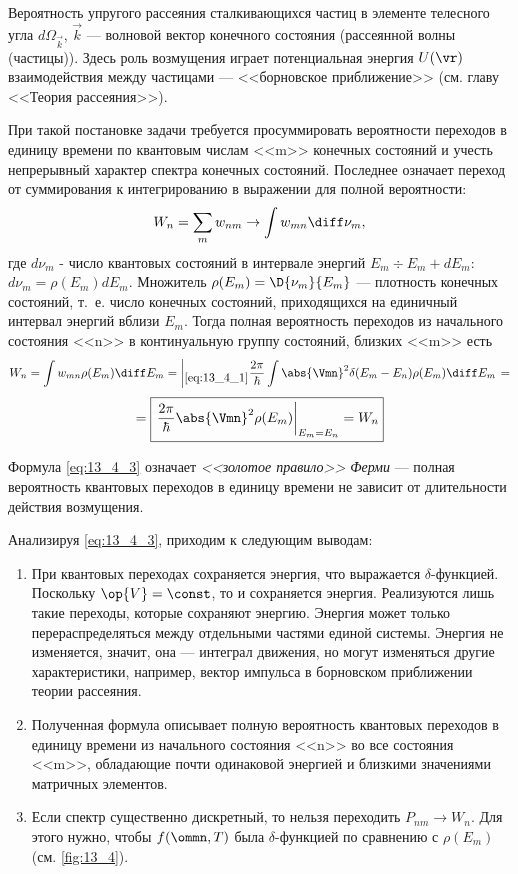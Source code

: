 \begin{exmpl}
Вероятность упругого рассеяния сталкивающихся частиц в элементе телесного угла $d\Omega_{\vec k}$, $\vec k$ --- волновой вектор конечного состояния (рассеянной волны (частицы)). Здесь роль возмущения играет потенциальная энергия $U(\vr)$ взаимодействия между частицами --- <<борновское приближение>> (см. главу  <<Теория рассеяния>>).
\end{exmpl}

При такой постановке задачи требуется просуммировать вероятности переходов в единицу времени по квантовым числам <<m>> конечных состояний и учесть непрерывный характер спектра конечных состояний. Последнее означает переход от суммирования к интегрированию в выражении для полной вероятности:
$$
W_n = \sum_m w_{nm} \to \int w_{mn} \diff\nu_m,
$$
где $d \nu_m$ - число квантовых состояний в интервале энергий $E_m \div E_m + dE_m$: \newline $\boxed{d \nu_m = \rho(E_m) dE_m}$. Множитель $\rho(E_m) = \D{\nu_m}{E_m}$ --- плотность конечных состояний, т.~е. число конечных состояний, приходящихся на единичный интервал энергий вблизи $E_m$. Тогда полная вероятность переходов из начального состояния <<n>> в континуальную группу состояний, близких <<m>> есть 
$$
W_n = \int w_{mn} \rho(E_m)\diff E_m = \left |_{\eqref{eq:13_4_1}} \dfrac{2\pi}{\hbar} \int \abs{\Vmn}^2 \delta(E_m - E_n) \rho(E_m)\diff E_m \right .=
$$
\begin{equation}
\label{eq:13_4_3}
= \boxed{ \left. \frac{2\pi}{\hbar} \abs{\Vmn}^2 \rho(E_m) \right|_{E_m = E_n} = W_n}
\end{equation}

Формула \eqref{eq:13_4_3} означает {\em <<золотое правило>> Ферми}\footnotemark{} --- полная вероятность квантовых переходов в единицу времени не зависит от длительности действия возмущения.

Анализируя \eqref{eq:13_4_3}, приходим к следующим выводам:
\begin{enumerate}
\item При квантовых переходах сохраняется энергия, что выражается $\delta$-функцией. Поскольку $\op{V} = \const$, то и сохраняется энергия. Реализуются лишь такие переходы, которые сохраняют энергию. Энергия может только перераспределяться между отдельными частями единой системы. Энергия не изменяется, значит, она --- интеграл движения, но могут изменяться другие характеристики, например, вектор импульса в борновском приближении теории рассеяния.

\item Полученная формула описывает полную вероятность квантовых переходов в единицу времени из начального состояния <<n>> во все состояния <<m>>, обладающие почти одинаковой энергией и близкими значениями матричных элементов. 

\item Если спектр существенно дискретный, то нельзя переходить ${P_{nm} \to W_n}$. Для этого нужно, чтобы $f(\ommn, T)$ была $\delta$-функцией по сравнению с $\rho(E_m)$ (см. \autoref{fig:13_4}). 
\end{enumerate}

